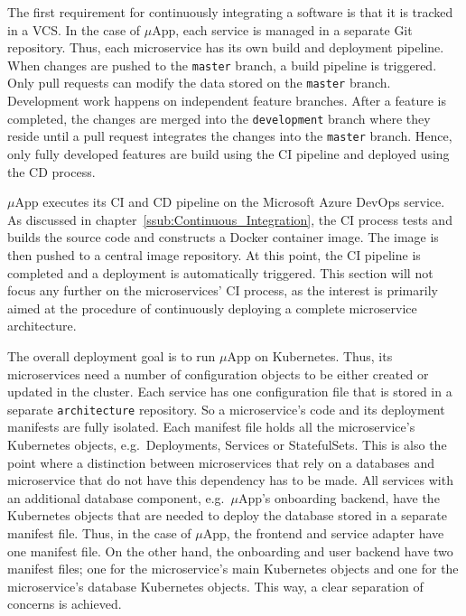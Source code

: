 The first requirement for continuously integrating a software is that it is
tracked in a \ac{VCS}. In the case of $\mu$App, each service is managed in a
separate Git repository. Thus, each microservice has its own build and
deployment pipeline. When changes are pushed to the \texttt{master} branch, a
build pipeline is triggered. Only pull requests can modify the data stored on
the \texttt{master} branch. Development work happens on independent feature
branches. After a feature is completed, the changes are merged into the
\texttt{development} branch where they reside until a pull request integrates
the changes into the \texttt{master} branch. Hence, only fully developed
features are build using the \ac{CI} pipeline and deployed using the \ac{CD}
process.

$\mu$App executes its \ac{CI} and \ac{CD} pipeline on the Microsoft Azure
DevOps service. As discussed in chapter~\ref{ssub:Continuous_Integration}, the
\ac{CI} process tests and builds the source code and constructs a Docker
container image. The image is then pushed to a central image repository. At
this point, the \ac{CI} pipeline is completed and a deployment is automatically
triggered. This section will not focus any further on the microservices'
\ac{CI} process, as the interest is primarily aimed at the procedure of
continuously deploying a complete microservice architecture.

The overall deployment goal is to run $\mu$App on Kubernetes. Thus, its
microservices need a number of configuration objects to be either created or
updated in the cluster. Each service has one configuration file that is stored
in a separate \texttt{architecture} repository. So a microservice's code and its
deployment manifests are fully isolated. Each manifest file holds all the
microservice's Kubernetes objects, e.g.\ Deployments, Services or StatefulSets.
This is also the point where a distinction between microservices that rely on a
databases and microservice that do not have this dependency has to be made. All
services with an additional database component, e.g.\ $\mu$App's onboarding
backend, have the Kubernetes objects that are needed to deploy the database
stored in a separate manifest file. Thus, in the case of $\mu$App, the frontend
and service adapter have one manifest file. On the other hand, the onboarding
and user backend have two manifest files; one for the microservice's main
Kubernetes objects and one for the microservice's database Kubernetes objects.
This way, a clear separation of concerns is achieved.

